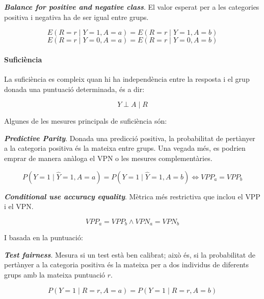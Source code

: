 \documentclass[CAT]{TFUOC}%
\begin{document}
\bigskip

\textbf{\emph{Balance for positive and negative class}}. El valor esperat per a les categories positiva i negativa ha de ser igual entre grups.

\begin{equation}
E(R = r \mid Y = 1, A = a) = E(R = r \mid Y = 1, A = b)
\end{equation} \begin{equation}
E(R = r \mid Y = 0, A = a) = E(R = r \mid Y = 0, A = b)
\end{equation}

\paragraph{Suficiència}\label{suficiuxe8ncia}

La suficiència es compleix quan hi ha independència entre la resposta i el grup donada una puntuació determinada, és a dir:

\begin{equation}
Y \perp A \mid R
\end{equation}

Algunes de les mesures principals de suficiència són:

\bigskip

\textbf{\emph{Predictive Parity}}. Donada una predicció positiva, la probabilitat de pertànyer a la categoria positiva és la mateixa entre grups. Una vegada més, es podrien emprar de manera anàloga el VPN o les mesures complementàries.

\begin{equation}
P(Y = 1\mid \hat Y = 1, A = a) = P(Y = 1\mid \hat Y = 1, A = b) \Leftrightarrow VPP_a = VPP_b
\end{equation}

\textbf{\emph{Conditional use accuracy equality}}. Mètrica més restrictiva que inclou el VPP i el VPN.

\begin{equation}
VPP_a = VPP_b \wedge VPN_a = VPN_b
\end{equation}

I basada en la puntuació:

\bigskip

\textbf{\emph{Test fairness}}. Mesura si un test està ben calibrat; això és, si la probabilitat de pertànyer a la categoria positiva és la mateixa per a dos individus de diferents grups amb la mateixa puntuació \(r\).

\begin{equation}
P(Y = 1\mid R = r, A = a) = P(Y = 1\mid R = r, A = b)
\end{equation}
\end{document}
